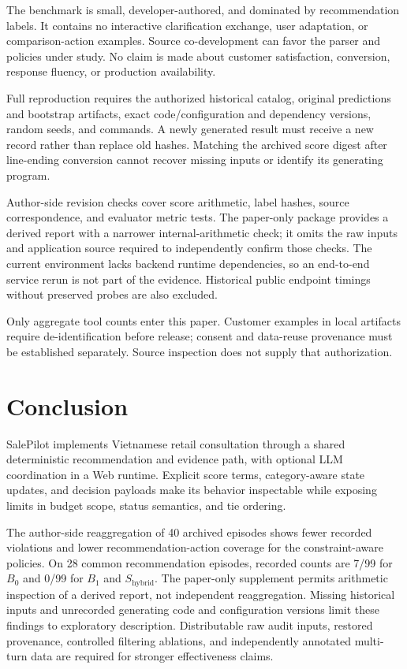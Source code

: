 \documentclass[conference,a4paper]{IEEEtran}
\newcommand{\sys}{S_{\mathrm{hybrid}}}
\begin{document}
The benchmark is small, developer-authored, and dominated by recommendation labels. It contains no interactive clarification exchange, user adaptation, or comparison-action examples. Source co-development can favor the parser and policies under study. No claim is made about customer satisfaction, conversion, response fluency, or production availability.

Full reproduction requires the authorized historical catalog, original predictions and bootstrap artifacts, exact code/configuration and dependency versions, random seeds, and commands. A newly generated result must receive a new record rather than replace old hashes. Matching the archived score digest after line-ending conversion cannot recover missing inputs or identify its generating program.

Author-side revision checks cover score arithmetic, label hashes, source correspondence, and evaluator metric tests. The paper-only package provides a derived report with a narrower internal-arithmetic check; it omits the raw inputs and application source required to independently confirm those checks. The current environment lacks backend runtime dependencies, so an end-to-end service rerun is not part of the evidence. Historical public endpoint timings without preserved probes are also excluded.

Only aggregate tool counts enter this paper. Customer examples in local artifacts require de-identification before release; consent and data-reuse provenance must be established separately. Source inspection does not supply that authorization.

\section{Conclusion}
SalePilot implements Vietnamese retail consultation through a shared deterministic recommendation and evidence path, with optional LLM coordination in a Web runtime. Explicit score terms, category-aware state updates, and decision payloads make its behavior inspectable while exposing limits in budget scope, status semantics, and tie ordering.

The author-side reaggregation of 40 archived episodes shows fewer recorded violations and lower recommendation-action coverage for the constraint-aware policies. On 28 common recommendation episodes, recorded counts are 7/99 for $B_0$ and 0/99 for $B_1$ and $\sys$. The paper-only supplement permits arithmetic inspection of a derived report, not independent reaggregation. Missing historical inputs and unrecorded generating code and configuration versions limit these findings to exploratory description. Distributable raw audit inputs, restored provenance, controlled filtering ablations, and independently annotated multi-turn data are required for stronger effectiveness claims.
\end{document}
